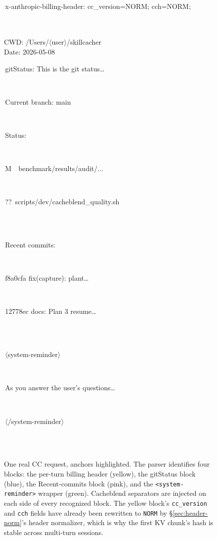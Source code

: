 \begin{figure}[h]
\begin{flushleft}\small\ttfamily
\fbox{\,\texttt{~\#~\#~}\,}\\[1pt]
\colorbox{anchorHeader}{\strut\,x-anthropic-billing-header:
cc\_version=NORM; cch=NORM;\,}\\
\fbox{\,\texttt{~\#~\#~}\,}\\[1pt]
CWD: /Users/$\langle$user$\rangle$/skillcacher\\
Date: 2026-05-08\\[3pt]
\colorbox{anchorGit}{\strut\,gitStatus: This is the git status\dots\,}\\
\colorbox{anchorGit}{\strut\,Current branch: main\,}\\
\colorbox{anchorGit}{\strut\,Status:\,}\\
\colorbox{anchorGit}{\strut\,M~~benchmark/results/audit/$\dots$\,}\\
\colorbox{anchorGit}{\strut\,??~scripts/dev/cacheblend\_quality.sh\,}\\
\fbox{\,\texttt{~\#~\#~}\,}\\[1pt]
\colorbox{anchorCommits}{\strut\,Recent commits:\,}\\
\colorbox{anchorCommits}{\strut\,f8a0cfa fix(capture): plant\dots\,}\\
\colorbox{anchorCommits}{\strut\,12778ec docs: Plan 3 resume\dots\,}\\
\fbox{\,\texttt{~\#~\#~}\,}\\[1pt]
\colorbox{anchorReminder}{\strut\,$\langle$system-reminder$\rangle$\,}\\
\colorbox{anchorReminder}{\strut\,As you answer the user's
questions\dots\,}\\
\colorbox{anchorReminder}{\strut\,$\langle$/system-reminder$\rangle$\,}\\
\fbox{\,\texttt{~\#~\#~}\,}\\[1pt]
\end{flushleft}
\caption{One real CC request, anchors highlighted. The parser
identifies four blocks: the per-turn billing header (yellow), the
gitStatus block (blue), the Recent-commits block (pink), and the
\texttt{<system-reminder>} wrapper (green). Cacheblend separators
are injected on each side of every recognized block. The yellow
block's \texttt{cc\_version} and \texttt{cch} fields have already
been rewritten to \texttt{NORM} by \S\ref{sec:header-norm}'s
header normalizer, which is why the first KV chunk's hash is
stable across multi-turn sessions.}
\label{fig:anchor-walkthrough}
\end{figure}

